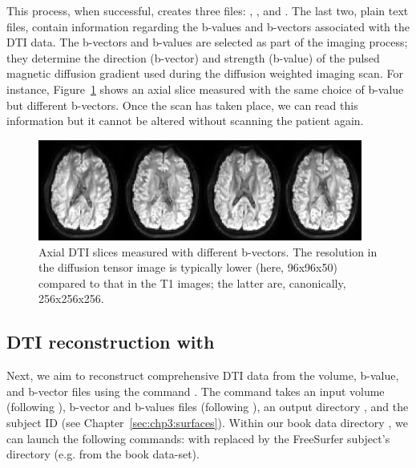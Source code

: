 This process, when successful, creates three files: ,
, and .  The last two, plain
text files, contain information regarding the b-values and
b-vectors associated with the DTI data.  %
% 
The b-vectors and b-values are selected as part of the imaging process; they 
determine the direction (b-vector) and strength (b-value) of the pulsed  
magnetic diffusion gradient used during the diffusion weighted imaging scan.  
For instance, Figure~\ref{fig:chp5:DTIslices} shows an axial slice measured 
with the same choice of b-value but different b-vectors.  Once the scan has 
taken place, we can read this information but it cannot be altered without 
scanning the patient again.  
\begin{figure}	
\begin{center}
  \includegraphics[width=0.95\textwidth]{./graphics/chp5/dwi.png}
\end{center}
\caption{Axial DTI slices measured with different b-vectors. The
  resolution in the diffusion tensor image is typically lower (here, 96x96x50)
	compared to that in the T1 images; the latter are, canonically, 
	256x256x256.}
\label{fig:chp5:DTIslices}
\end{figure}

\subsection{DTI reconstruction with \freesurfer}
\label{sec:chp-dti:freesurfer-dtrecon}
Next, we aim to reconstruct comprehensive DTI data from the volume,
b-value, and b-vector files using the \freesurfer{} command
. The command takes an input volume (following
), b-vector and b-values files (following ), an
output directory , and the  subject ID
 (see Chapter~\ref{sec:chp3:surfaces}). Within our book data 
directory , we can launch the following commands:
\noindent with  replaced by the FreeSurfer subject's
directory (e.g.  from the book data-set).

